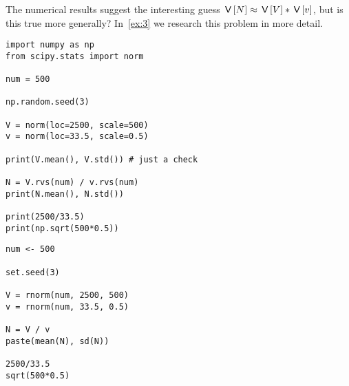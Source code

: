 \documentclass[assignments]{subfiles}
\begin{document}
\begin{exercise}
The numerical results suggest the interesting guess $\,\mathsf{V}\left[N\right] \approx \,\mathsf{V}\left[V\right] * \,\mathsf{V}\left[v\right]$, but  is this true more generally? In~\cref{ex:3} we research this problem in more detail.

\begin{verbatim}
import numpy as np
from scipy.stats import norm

num = 500

np.random.seed(3)

V = norm(loc=2500, scale=500)
v = norm(loc=33.5, scale=0.5)

print(V.mean(), V.std()) # just a check

N = V.rvs(num) / v.rvs(num)
print(N.mean(), N.std())

print(2500/33.5)
print(np.sqrt(500*0.5))
\end{verbatim}

\begin{verbatim}
num <- 500

set.seed(3)

V = rnorm(num, 2500, 500)
v = rnorm(num, 33.5, 0.5)

N = V / v
paste(mean(N), sd(N))

2500/33.5
sqrt(500*0.5)
\end{verbatim}
\end{exercise}
\end{document}

